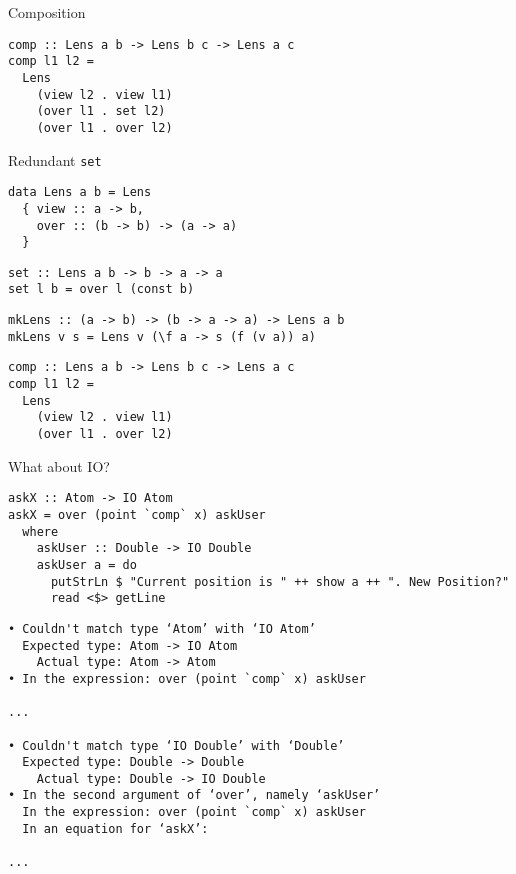 \documentclass[presentation,aspectratio=169,8pt]{beamer}
\begin{document}
\begin{frame}[label={sec:orgacc5d90},fragile]{Composition}
 \begin{verbatim}
comp :: Lens a b -> Lens b c -> Lens a c
comp l1 l2 =
  Lens
    (view l2 . view l1)
    (over l1 . set l2)
    (over l1 . over l2)
\end{verbatim}
\end{frame}

\begin{frame}[label={sec:orga75e9e7},fragile]{Redundant \texttt{set}}
 \begin{verbatim}
data Lens a b = Lens
  { view :: a -> b,
    over :: (b -> b) -> (a -> a)
  }
\end{verbatim}

\pause

\begin{verbatim}
set :: Lens a b -> b -> a -> a
set l b = over l (const b)
\end{verbatim}

\pause

\begin{verbatim}
mkLens :: (a -> b) -> (b -> a -> a) -> Lens a b
mkLens v s = Lens v (\f a -> s (f (v a)) a)
\end{verbatim}

\pause

\begin{verbatim}
comp :: Lens a b -> Lens b c -> Lens a c
comp l1 l2 =
  Lens
    (view l2 . view l1)
    (over l1 . over l2)
\end{verbatim}
\end{frame}

\begin{frame}[label={sec:orgc2ac0ff},fragile]{What about IO?}
 \begin{verbatim}
askX :: Atom -> IO Atom
askX = over (point `comp` x) askUser
  where
    askUser :: Double -> IO Double
    askUser a = do
      putStrLn $ "Current position is " ++ show a ++ ". New Position?"
      read <$> getLine
\end{verbatim}

\pause

\begin{verbatim}
• Couldn't match type ‘Atom’ with ‘IO Atom’
  Expected type: Atom -> IO Atom
    Actual type: Atom -> Atom
• In the expression: over (point `comp` x) askUser

...

• Couldn't match type ‘IO Double’ with ‘Double’
  Expected type: Double -> Double
    Actual type: Double -> IO Double
• In the second argument of ‘over’, namely ‘askUser’
  In the expression: over (point `comp` x) askUser
  In an equation for ‘askX’:

...
\end{verbatim}
\end{frame}
\end{document}
